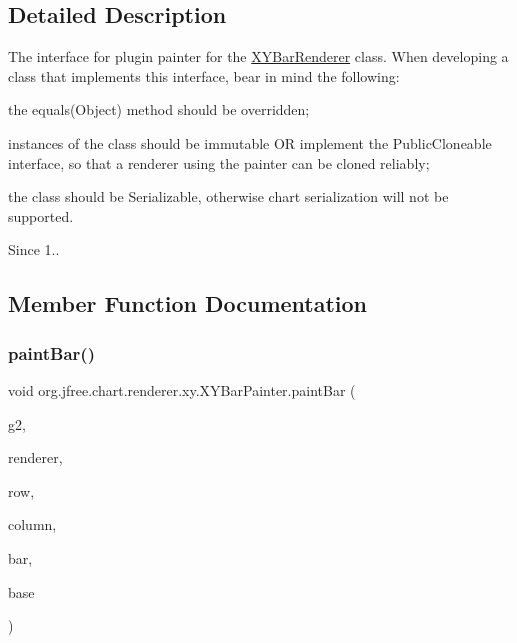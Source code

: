 \subsection{Detailed Description}
The interface for plugin painter for the \mbox{\hyperlink{classorg_1_1jfree_1_1chart_1_1renderer_1_1xy_1_1_x_y_bar_renderer}{X\+Y\+Bar\+Renderer}} class. When developing a class that implements this interface, bear in mind the following\+: 
\begin{DoxyItemize}
\item the {\ttfamily equals(\+Object)} method should be overridden; 
\item instances of the class should be immutable OR implement the {\ttfamily Public\+Cloneable} interface, so that a renderer using the painter can be cloned reliably; 
\item the class should be {\ttfamily Serializable}, otherwise chart serialization will not be supported. 
\end{DoxyItemize}

\begin{DoxySince}{Since}
1.. 
\end{DoxySince}


\subsection{Member Function Documentation}
\mbox{\label{interfaceorg_1_1jfree_1_1chart_1_1renderer_1_1xy_1_1_x_y_bar_painter_a539677e6d12123df18c2ec0c55db5b4b}} 
\subsubsection{\texorpdfstring{paint\+Bar()}{paintBar()}}
{\footnotesize\ttfamily void org.\+jfree.\+chart.\+renderer.\+xy.\+X\+Y\+Bar\+Painter.\+paint\+Bar (\begin{DoxyParamCaption}\item[{Graphics2D}]{g2,  }\item[{\mbox{\hyperlink{classorg_1_1jfree_1_1chart_1_1renderer_1_1xy_1_1_x_y_bar_renderer}{X\+Y\+Bar\+Renderer}}}]{renderer,  }\item[{int}]{row,  }\item[{int}]{column,  }\item[{Rectangular\+Shape}]{bar,  }\item[{Rectangle\+Edge}]{base }\end{DoxyParamCaption})}

